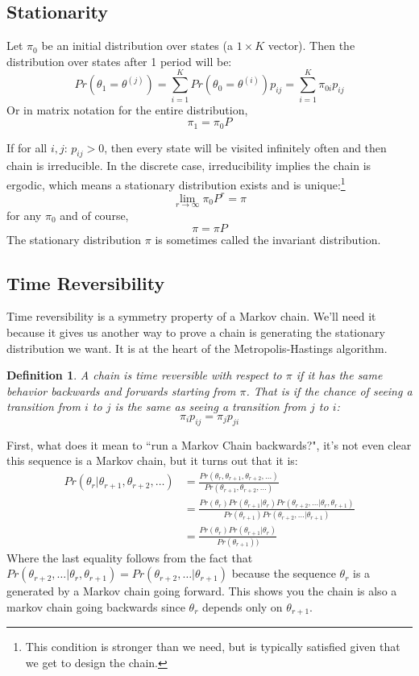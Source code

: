 \documentclass[twoside]{article}
\newtheorem{definition}[theorem]{Definition}
\begin{document}
\subsection{Stationarity}

Let $\pi_0$ be an initial distribution over states (a $1 \times K$ vector). Then the distribution over states after 1 period will be:
$$Pr( \theta_1 = \theta^{(j)}) = \sum_{i=1}^K Pr(\theta_0 = \theta^{(i)}) p_{ij} = \sum_{i=1}^K \pi_{0i} p_{ij} $$
Or in matrix notation for the entire distribution, 
$$\pi_1 = \pi_0 P$$

If for all $i,j$: $p_{ij} > 0$, then every state will be visited infinitely often and then chain is irreducible. In the discrete case, irreducibility implies 
the chain is ergodic, which means a stationary distribution exists and is unique:\footnote{This condition is stronger than we need, but is typically satisfied given that we get to design the chain.} 
$$ \lim_{r \rightarrow \infty} \pi_0P^r = \pi$$
for any $\pi_0$ and of course, 
$$ \pi = \pi P $$
The stationary distribution $\pi$ is sometimes called the invariant distribution. 

\subsection{Time Reversibility}

Time reversibility is a symmetry property of a Markov chain. We'll need it because it gives us another way to prove a chain is generating the stationary distribution we want. It is at the heart of the Metropolis-Hastings algorithm. 

\begin{definition} A chain is time reversible with respect to $\pi$ if it has the same behavior backwards and forwards starting from $\pi$. That is if the chance of seeing a transition from $i$ to $j$ is the same as seeing a transition from $j$ to $i$: 
$$ \pi_i p_{ij} = \pi_j p_{ji}$$
\end{definition}

First, what does it mean to ``run a Markov Chain backwards?", it's not even clear this sequence is a Markov chain, but it turns out that it is:
\begin{align*}
Pr(\theta_r| \theta_{r+1}, \theta_{r+2}, \ldots) &= \frac{Pr(\theta_r, \theta_{r+1}, \theta_{r+2}, \ldots)}{Pr(\theta_{r+1}, \theta_{r+2}, \ldots)} \\
& =  \frac{Pr(\theta_r) Pr(\theta_{r+1} | \theta_r) Pr(\theta_{r+2}, \ldots | \theta_r, \theta_{r+1})}{Pr(\theta_{r+1}) Pr(\theta_{r+2}, \ldots| \theta_{r+1})} \\
& = \frac{Pr(\theta_r) Pr(\theta_{r+1} | \theta_r) }{Pr(\theta_{r+1}))} 
\end{align*}
Where the last equality follows from the fact that $Pr(\theta_{r+2}, \ldots | \theta_r, \theta_{r+1}) = Pr(\theta_{r+2}, \ldots| \theta_{r+1})$ because the sequence $\theta_r$ is a generated by a Markov chain going forward. This shows you the chain is also a markov chain going backwards since $\theta_r$ depends only on $\theta_{r+1}$.
\end{document}
